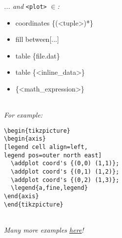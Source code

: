 \textit{... and }\texttt{<plot>}\textit{ $\in$:}\\
\begin{itemize}[label={}]
    \item coordinates \{(<tuple>)*\}
    \item fill between[...]
    \item table \{file.dat\}
    \item table \{<inline\_data>\}
    \item \{<math\_expression>\}
\end{itemize}\ \\

\textit{For example: }\\
\begin{minipage}{6.5cm}
\begin{lstlisting}
\begin{tikzpicture}
\begin{axis}
[legend cell align=left,
legend pos=outer north east]
  \addplot coord's {(0,0) (1,1)};
  \addplot coord's {(0,1) (1,2)};
  \addplot coord's {(0,2) (1,3)};
  \legend{a,fine,legend}
\end{axis}
\end{tikzpicture}
\end{lstlisting}
\end{minipage}\ \\

\textit{Many more examples \href{http://pgfplots.sourceforge.net/gallery.html}{\underline{here}}!}
 \ \\